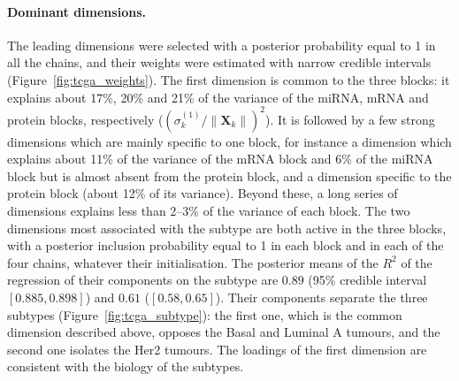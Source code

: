 \documentclass[11pt]{article}
\newcommand{\X}{\mathbf{X}}
\begin{document}
\paragraph{Dominant dimensions.} The leading dimensions were selected with a posterior probability equal to 1 in all the chains, and their weights were estimated with narrow credible intervals (Figure~\ref{fig:tcga_weights}). The first dimension is common to the three blocks: it explains about 17\%, 20\% and 21\% of the variance of the miRNA, mRNA and protein blocks, respectively ($(\sigma_k^{(1)}/\|\X_k\|)^2$). It is followed by a few strong dimensions which are mainly specific to one block, for instance a dimension which explains about 11\% of the variance of the mRNA block and 6\% of the miRNA block but is almost absent from the protein block, and a dimension specific to the protein block (about 12\% of its variance). Beyond these, a long series of dimensions explains less than 2--3\% of the variance of each block. The two dimensions most associated with the subtype are both active in the three blocks, with a posterior inclusion probability equal to 1 in each block and in each of the four chains, whatever their initialisation. The posterior means of the $R^2$ of the regression of their components on the subtype are $0.89$ (95\% credible interval $[0.885,0.898]$) and $0.61$ ($[0.58,0.65]$). Their components separate the three subtypes (Figure~\ref{fig:tcga_subtype}): the first one, which is the common dimension described above, opposes the Basal and Luminal A tumours, and the second one isolates the Her2 tumours. 
The loadings of the first dimension are consistent with the biology of the subtypes. 
\end{document}
